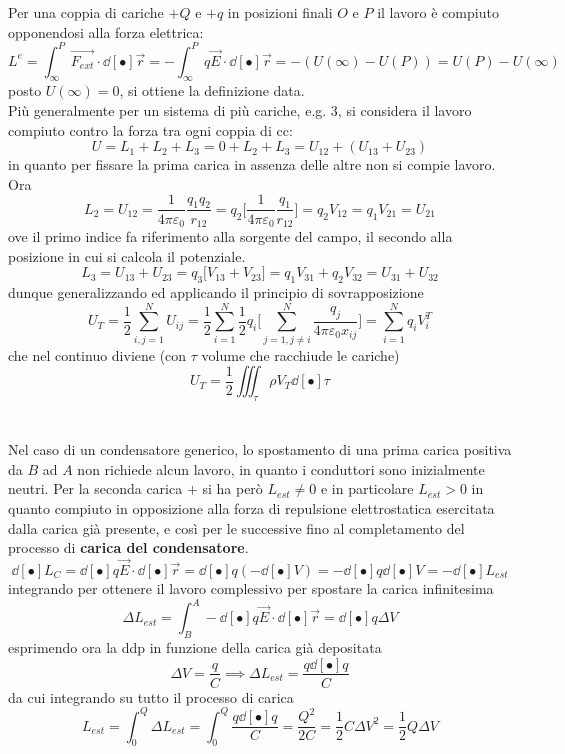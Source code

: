 Per una coppia di cariche $+Q$ e $+q$ in posizioni finali $O$ e $P$ il lavoro è compiuto opponendosi alla forza elettrica:
\[L^e = \int_\infty^P \vec{F_{ext}} \cdot \dd[•]{\vec{r}} = - \int_\infty^P q\vec{E} \cdot \dd[•]{\vec{r}} = - (U(\infty) - U(P)) = U(P) - U(\infty)\]
posto $U(\infty) = 0$, si ottiene la definizione data.
\\Più generalmente per un sistema di più cariche, e.g. 3, si considera il lavoro compiuto contro la forza tra ogni coppia di cc:
\[U = L_1 + L_2 + L_3 = 0 + L_2 + L_3 = U_{12} + (U_{13} + U_{23})\]
in quanto per fissare la prima carica in assenza delle altre non si compie lavoro. Ora
\[L_2 = U_{12} = \frac{1}{4 \pi \varepsilon_0} \frac{q_1 q_2}{r_{12}} = q_2 \bigg[\frac{1}{4 \pi \varepsilon_0} \frac{q_1}{r_{12}}\bigg] = q_2 V_{12} = q_1 V_{21} = U_{21}\]
ove il primo indice fa riferimento alla sorgente del campo, il secondo alla posizione in cui si calcola il potenziale.
\[L_3 = U_{13} + U_{23} = q_3 \big[V_{13} + V_{23}\big] = q_1 V_{31} + q_2 V_{32} = U_{31} + U_{32}\]
dunque generalizzando ed applicando il principio di sovrapposizione
\[U_T = \frac{1}{2} \sum\limits_{i,j=1}^{N} U_{ij} = \frac{1}{2} \sum\limits_{i=1}^{N} \frac{1}{2} q_i \bigg[\sum\limits_{j=1, j \neq i}^{N} \frac{q_j}{4 \pi \varepsilon_0 x_{ij}}\bigg] = \sum\limits_{i=1}^{N} q_i V_{i}^{T}\]
che nel continuo diviene (con $\tau$ volume che racchiude le cariche)
\[U_T = \frac{1}{2} \iiint_\tau \rho V_T \dd[•]{\tau}\]
\\~\\
Nel caso di un condensatore generico, lo spostamento di una prima carica positiva da $B$ ad $A$ non richiede alcun lavoro, in quanto i conduttori sono inizialmente neutri. Per la seconda carica $+$ si ha però $L_{est} \neq 0$ e in particolare $L_{est} > 0$ in quanto compiuto in opposizione alla forza di repulsione elettrostatica esercitata dalla carica già presente, e così per le successive fino al completamento del processo di \textbf{carica del condensatore}.
\[\dd[•]{L_C} = \dd[•]{q} \vec{E} \cdot \dd[•]{\vec{r}} = \dd[•]{q} (- \dd[•]{V}) = - \dd[•]{q} \dd[•]{V} = - \dd[•]{L_{est}}\]
integrando per ottenere il lavoro complessivo per spostare la carica infinitesima
\[\Delta L_{est} = \int_B^A - \dd[•]{q} \vec{E} \cdot \dd[•]{\vec{r}} = \dd[•]{q} \Delta V\]
esprimendo ora la ddp in funzione della carica già depositata
\[\Delta V = \frac{q}{C} \implies \Delta L_{est} = \frac{q \dd[•]{q}}{C}\]
da cui integrando su tutto il processo di carica
\[L_{est} = \int_0^Q \Delta L_{est} = \int_0^Q \frac{q \dd[•]{q}}{C} = \frac{Q^2}{2C} = \frac{1}{2} C \Delta V^2 = \frac{1}{2} Q \Delta V\]
